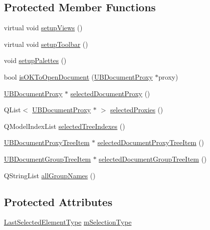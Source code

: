 \subsection*{Protected Member Functions}
\begin{DoxyCompactItemize}
\item 
virtual void \hyperlink{class_u_b_document_controller_abb172787a34a34cd3c2df0a1b46918c5}{setup\-Views} ()
\item 
virtual void \hyperlink{class_u_b_document_controller_a746006520fbb0350696fb30daa5c5141}{setup\-Toolbar} ()
\item 
void \hyperlink{class_u_b_document_controller_a8478146da974d97d711cfe769bd14a08}{setup\-Palettes} ()
\item 
bool \hyperlink{class_u_b_document_controller_a44455463bc3b89da099285d7ac877ff7}{is\-O\-K\-To\-Open\-Document} (\hyperlink{class_u_b_document_proxy}{U\-B\-Document\-Proxy} $\ast$proxy)
\item 
\hyperlink{class_u_b_document_proxy}{U\-B\-Document\-Proxy} $\ast$ \hyperlink{class_u_b_document_controller_ac009dfae4ba933392930af69b2f4641a}{selected\-Document\-Proxy} ()
\item 
Q\-List$<$ \hyperlink{class_u_b_document_proxy}{U\-B\-Document\-Proxy} $\ast$ $>$ \hyperlink{class_u_b_document_controller_a9b97588b2b1c80196ac783ab0a3ec42b}{selected\-Proxies} ()
\item 
Q\-Model\-Index\-List \hyperlink{class_u_b_document_controller_a2f7342bf55f69cf7e3c569e25229fa1e}{selected\-Tree\-Indexes} ()
\item 
\hyperlink{class_u_b_document_proxy_tree_item}{U\-B\-Document\-Proxy\-Tree\-Item} $\ast$ \hyperlink{class_u_b_document_controller_a7bf63b3b586ecce8c3de7bb27b72ed95}{selected\-Document\-Proxy\-Tree\-Item} ()
\item 
\hyperlink{class_u_b_document_group_tree_item}{U\-B\-Document\-Group\-Tree\-Item} $\ast$ \hyperlink{class_u_b_document_controller_aa81a398aff72b43053fffa6bc0cafbda}{selected\-Document\-Group\-Tree\-Item} ()
\item 
Q\-String\-List \hyperlink{class_u_b_document_controller_aeae1191e3ccea969b2d4fffde62f5256}{all\-Group\-Names} ()
\end{DoxyCompactItemize}
\subsection*{Protected Attributes}
\begin{DoxyCompactItemize}
\item 
\hyperlink{class_u_b_document_controller_a817080b199ec90e8d8133cef019c7306}{Last\-Selected\-Element\-Type} \hyperlink{class_u_b_document_controller_a5dff5d4455f06313db9c053c641da7dc}{m\-Selection\-Type}
\end{DoxyCompactItemize}

